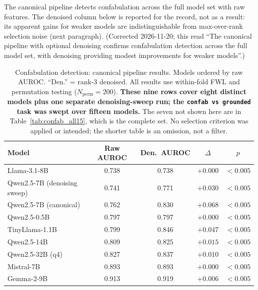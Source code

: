 \documentclass[11pt,a4paper]{article}
\begin{document}
The canonical pipeline detects confabulation across the full model set
with raw features. The denoised column below is reported for the record,
not as a result: its apparent gains for weaker models are
indistinguishable from max-over-rank selection noise (next paragraph).
(Corrected 2026-11-20; this read ``The canonical pipeline with optional
denoising confirms confabulation detection across the full model set, with
denoising providing modest improvements for weaker models''.)

\begin{table}[h]
\centering
\caption{Confabulation detection: canonical pipeline results. Models ordered
  by raw AUROC. ``Den.'' = rank-3 denoised. All results use within-fold FWL
  and permutation testing ($N_{\text{perm}} = 200$). \textbf{These nine rows
  cover eight distinct models plus one separate denoising-sweep run; the
  \texttt{confab vs grounded} task was swept over fifteen models.} The seven
  not shown here are in Table~\ref{tab:confab_all15}, which is the complete
  set. No selection criterion was applied or intended; the shorter table is an
  omission, not a filter.}
\label{tab:confab_all}
\begin{tabular}{lcccc}
\toprule
\textbf{Model} & \textbf{Raw AUROC} & \textbf{Den.\ AUROC} & \textbf{$\Delta$} & \textbf{$p$} \\
\midrule
Llama-3.1-8B & 0.738 & 0.738 & $+0.000$ & $< 0.005$ \\
Qwen2.5-7B (denoising sweep) & 0.741 & 0.771 & $+0.030$ & $< 0.005$ \\
Qwen2.5-7B (canonical) & 0.762 & 0.830 & $+0.068$ & $< 0.005$ \\
Qwen2.5-0.5B & 0.797 & 0.797 & $+0.000$ & $< 0.005$ \\
TinyLlama-1.1B & 0.799 & 0.846 & $+0.047$ & $< 0.005$ \\
Qwen2.5-14B & 0.809 & 0.825 & $+0.015$ & $< 0.005$ \\
Qwen2.5-32B (q4) & 0.827 & 0.837 & $+0.010$ & $< 0.005$ \\
Mistral-7B & 0.893 & 0.893 & $+0.000$ & $< 0.005$ \\
Gemma-2-9B & 0.913 & 0.919 & $+0.006$ & $< 0.005$ \\
\bottomrule
\end{tabular}
\end{table}
\end{document}
